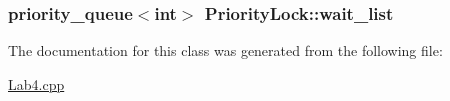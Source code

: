 \subsubsection[{\texorpdfstring{wait\+\_\+list}{wait_list}}]{\setlength{\rightskip}{0pt plus 5cm}priority\+\_\+queue$<$int$>$ Priority\+Lock\+::wait\+\_\+list\hspace{0.3cm}{\ttfamily [private]}}\hypertarget{classPriorityLock_ae1c22f9c1af23bfdc5db44bf52888c32}{}\label{classPriorityLock_ae1c22f9c1af23bfdc5db44bf52888c32}


The documentation for this class was generated from the following file\+:\begin{DoxyCompactItemize}
\item 
\hyperlink{Lab4_8cpp}{Lab4.\+cpp}\end{DoxyCompactItemize}
